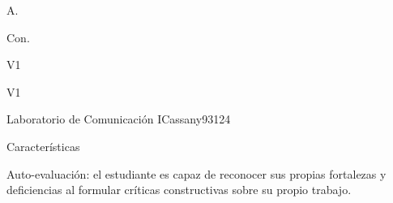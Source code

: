 \begin{syllabus}


\begin{justification}
A. 
\end{justification}

\begin{goals}
\item Con. 
\end{goals}

\begin{outcomes}{V1}
     \item {}
     \item {}
     \item {}
     \item {}
\end{outcomes}

\begin{competences}{V1}
    \item {}
    \item {}
    \item {}
\end{competences}

\begin{unit}{Laboratorio de Comunicación I}{}{Cassany93}{12}{4}
   \begin{topics}
      \item Características 
   \end{topics}
   \begin{learningoutcomes}
      \item Auto-evaluación: el estudiante es capaz de reconocer sus propias fortalezas y deficiencias al formular críticas constructivas sobre su propio trabajo.
   \end{learningoutcomes}
\end{unit}

\begin{coursebibliography}
\end{coursebibliography}

\end{syllabus}
